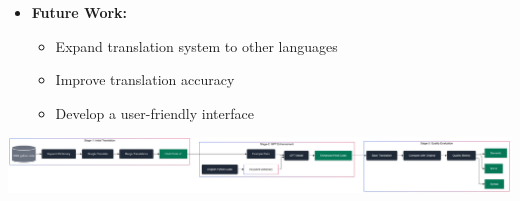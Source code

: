 \documentclass[20pt]{extarticle}
\begin{document}
{\begin{tcolorbox}[title= \centering Conclusion]
\begin{itemize}
        \item \textbf{Future Work:} 
              \begin{itemize}
                  \item Expand translation system to other languages
                  \item Improve translation accuracy
                  \item Develop a user-friendly interface
              \end{itemize}
    \end{itemize}
\end{tcolorbox}
}


\includegraphics[width=\textwidth]{images/final-flow-1.png}

    


 
\end{document}
